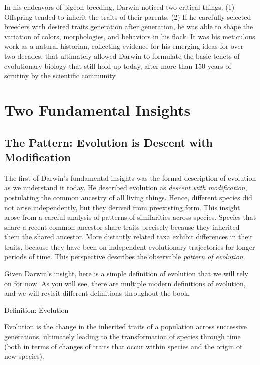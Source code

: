\documentclass[
]{book}
\begin{document}
In his endeavors of pigeon breeding, Darwin noticed two critical things: (1) Offspring tended to inherit the traits of their parents. (2) If he carefully selected breeders with desired traits generation after generation, he was able to shape the variation of colors, morphologies, and behaviors in his flock. It was his meticulous work as a natural historian, collecting evidence for his emerging ideas for over two decades, that ultimately allowed Darwin to formulate the basic tenets of evolutionary biology that still hold up today, after more than 150 years of scrutiny by the scientific community.

\hypertarget{two-fundamental-insights}{%
\section{Two Fundamental Insights}\label{two-fundamental-insights}}

\hypertarget{predictions}{%
\subsection{The Pattern: Evolution is Descent with Modification}\label{predictions}}

The first of Darwin's fundamental insights was the formal description of evolution as we understand it today. He described evolution as \emph{descent with modification}, postulating the common ancestry of all living things. Hence, different species did not arise independently, but they derived from preexisting form. This insight arose from a careful analysis of patterns of similarities across species. Species that share a recent common ancestor share traits precisely because they inherited them the shared ancestor. More distantly related taxa exhibit differences in their traits, because they have been on independent evolutionary trajectories for longer periods of time. This perspective describes the observable \emph{pattern of evolution}.

Given Darwin's insight, here is a simple definition of evolution that we will rely on for now. As you will see, there are multiple modern definitions of evolution, and we will revisit different definitions throughout the book.

Definition: Evolution

Evolution is the change in the inherited traits of a population across successive generations, ultimately leading to the transformation of species through time (both in terms of changes of traits that occur within species and the origin of new species).
\end{document}
